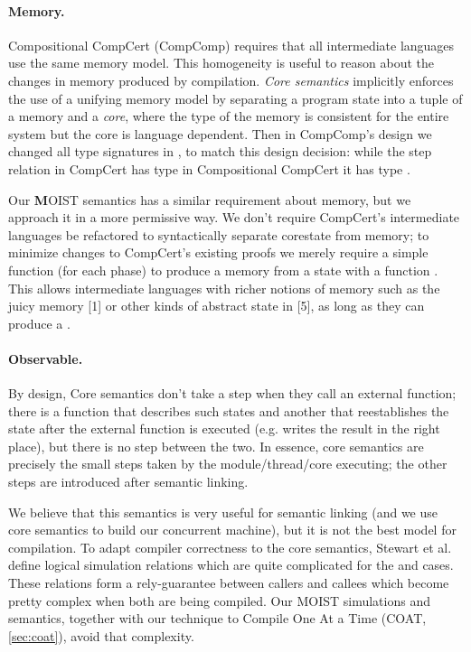 \paragraph{Memory.} Compositional CompCert (CompComp) requires that all intermediate languages use the same memory model. This homogeneity is useful to reason about the changes in memory produced by compilation. \emph{Core semantics} implicitly enforces the use of a unifying memory model by separating a program state into a tuple of a memory and a \emph{core}, where the type of the memory is consistent for the entire system but the core is language dependent. Then in CompComp's design we changed all type signatures in \compcert , to match this design decision: while the step relation in CompCert has type  in Compositional CompCert it has type . 

Our \textbf{M}OIST semantics has a similar requirement about memory, but we approach it in a more permissive way. We don't require CompCert's intermediate languages be refactored to syntactically separate corestate from memory; to minimize changes to CompCert's existing proofs we merely require a simple function (for each phase) to produce a memory from a state  with a function . This allows intermediate languages with richer notions of memory such as the juicy memory [1] or other kinds of abstract state in [5], as long as they can produce a  . 

\paragraph{Observable.} By design, Core semantics \cite{compcomp} don't take a step when they call an external function; there is a function   that describes such states and another  that reestablishes the state after the external function is executed (e.g. writes the result in the right place), but there is no step between the two. In essence, core semantics are precisely the small steps taken by the module/thread/core executing; the other steps are introduced after semantic linking. 

We believe that this semantics is very useful for semantic linking (and we use core semantics to build our concurrent machine), but it is not the best model for compilation. To adapt compiler correctness to the core semantics, Stewart et al. \cite{compcomp} define logical simulation relations which are quite complicated for the   and  cases. These relations form a rely-guarantee between callers and callees which become pretty complex when both are being compiled. Our MOIST simulations and semantics, together with our technique to Compile One At a Time (COAT, \autoref{sec:coat}), avoid that complexity.  

